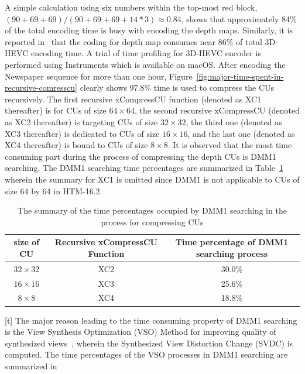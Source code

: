A simple calculation using six numbers within the top-most
red block, \((90+69+69)/(90+69+69+14*3) \approx 0.84\), shows that
approximately 84\% of the total encoding time is busy with encoding
the depth maps.
Similarly, it is reported in~\parencite{RN111} that the coding for depth map
consumes near 86\% of total 3D-HEVC encoding time.
A trial of time profiling for 3D-HEVC encoder is performed using Instruments
which is available on macOS\@.
After encoding the Newspaper sequence for more than one hour,
Figure~\ref{fig:major-time-spent-in-recursive-comresscu} clearly shows
97.8\% time is used to compress the CUs recursively.
The first recursive xCompressCU function (denoted as XC1 thereafter) is
for CUs of size \(64\times64\), the second recursive xCompressCU
(denoted as XC2 thereafter) is targeting CUs of size \(32\times32\),
the third one (denoted as XC3 thereafter) is dedicated
to CUs of size \(16\times16\), and the last one (denoted as XC4 thereafter) is bound
to CUs of size \(8\times8\).
It is observed that the most time consuming part during the process of
compressing the depth CUs is DMM1 searching.
The DMM1 searching time percentages are summarized in
Table~\ref{tab:dmm1-searching-time-percent-summary} wherein the summary
for XC1 is omitted since DMM1 is not applicable to CUs of size 64 by 64 in
HTM-16.2.
\begin{table}[t]
    \caption{The summary of the time percentages occupied by DMM1 searching in the process for compressing CUs}
    \bigskip\label{tab:dmm1-searching-time-percent-summary}
    \centering
    \begin{tabular}{c c c}
        \toprule
        size of CU & Recursive xCompressCU Function & Time percentage of DMM1 searching process\\
        \midrule
        \(32\times32\)  & XC2 & 30.0\% \\
        \(16\times16\) & XC3 & 25.6\% \\
        \(8\times8\) & XC4 & 18.8\% \\
        \bottomrule
    \end{tabular}
\end{table}[t]
The major reason leading to the time consuming property of DMM1 searching is the
View Synthesis Optimization (VSO) Method for improving quality of
synthesized views~\parencite{RN124}, wherein the Synthesized View Distortion
Change (SVDC) is computed.
The time percentages of the VSO processes in DMM1 searching are summarized in
